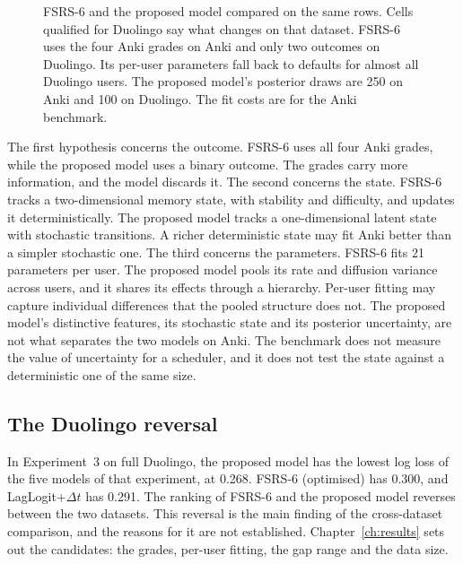 \begin{figure}[htbp]
  \centering
  
  \caption[FSRS-6 and the proposed model]{FSRS-6 and the proposed model compared on the same rows. Cells qualified for Duolingo say what
    changes on that dataset. FSRS-6 uses the four Anki grades on Anki and only two outcomes on Duolingo.
    Its per-user parameters fall back to defaults for almost all Duolingo users. The proposed model's posterior
    draws are 250 on Anki and 100 on Duolingo. The fit costs are for the Anki benchmark.}
  \label{fig:tk_fsrs_vs_ours}
\end{figure}

The first hypothesis concerns the outcome. FSRS-6 uses all four Anki grades, while the proposed model
uses a binary outcome. The grades carry more information, and the model discards it. The second concerns the state.
FSRS-6 tracks a two-dimensional memory state, with stability and difficulty, and updates it deterministically. The
proposed model tracks a one-dimensional latent state with stochastic transitions. A richer deterministic state may
fit Anki better than a simpler stochastic one. The third concerns the parameters. FSRS-6 fits 21 parameters
per user. The proposed model pools its rate and diffusion variance across users, and it shares its effects through a
hierarchy. Per-user fitting may capture individual differences that the pooled structure does not. The
proposed model's distinctive features, its stochastic state and its posterior uncertainty, are not what
separates the two models on Anki. The benchmark does not measure the value of uncertainty for a scheduler,
and it does not test the state against a deterministic one of the same size.

\subsection*{The Duolingo reversal}

In Experiment~3 on full Duolingo, the proposed model has the lowest log loss of the five models of that experiment, at 0.268. FSRS-6 (optimised)
has 0.300, and LagLogit+$\Delta t$ has 0.291. The ranking of FSRS-6 and the proposed model reverses between the two
datasets. This reversal is the main finding of the cross-dataset comparison, and the reasons for it are not established.
Chapter~\ref{ch:results} sets out the candidates: the grades, per-user fitting, the gap range and the data size.

